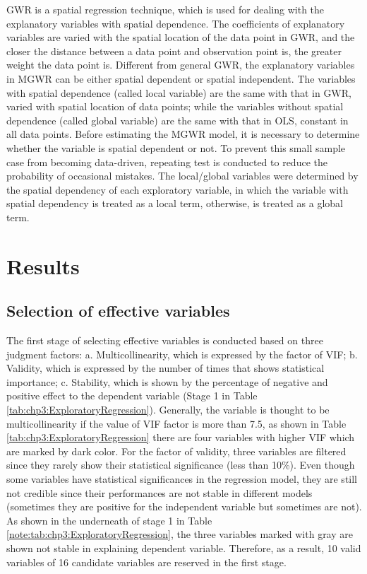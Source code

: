 %
GWR is a spatial regression technique, which is used for dealing with the explanatory variables with spatial dependence. The coefficients of explanatory variables are varied with the spatial location of the data point in GWR, and the closer the distance between a data point and observation point is, the greater weight the data point is. Different from general GWR, the explanatory variables in MGWR can be either spatial dependent or spatial independent. The variables with spatial dependence (called local variable) are the same with that in GWR, varied with spatial location of data points; while the variables without spatial dependence (called global variable) are the same with that in OLS, constant in all data points. Before estimating the MGWR model, it is necessary to determine whether the variable is spatial dependent or not. To prevent this small sample case from becoming data-driven, repeating test is conducted to reduce the probability of occasional mistakes. The local/global variables were determined by the spatial dependency of each exploratory variable, in which the variable with spatial dependency is treated as a local term, otherwise, is treated as a global term.

%
\section{Results}
\subsection{Selection of effective variables}
%
The first stage of selecting effective variables is conducted based on three judgment factors: a. Multicollinearity, which is expressed by the factor of VIF; b. Validity, which is expressed by the number of times that shows statistical importance; c. Stability, which is shown by the percentage of negative and positive effect to the dependent variable (Stage 1 in Table \ref{tab:chp3:ExploratoryRegression}). Generally, the variable is thought to be multicollinearity if the value of VIF factor is more than 7.5, as shown in Table \ref{tab:chp3:ExploratoryRegression} there are four variables with higher VIF which are marked by dark color. For the factor of validity, three variables are filtered since they rarely show their statistical significance (less than 10\%). Even though some variables have statistical significances in the regression model, they are still not credible since their performances are not stable in different models (sometimes they are positive for the independent variable but sometimes are not). As shown in the underneath of stage 1 in Table \ref{note:tab:chp3:ExploratoryRegression}, the three variables marked with gray are shown not stable in explaining dependent variable. Therefore, as a result, 10 valid variables of 16 candidate variables are reserved in the first stage.

